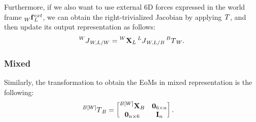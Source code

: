Furthermore, if we also want to use external 6D forces expressed in the world frame $\forcesix[W]_L^{ext}$, we can obtain the right-trivialized Jacobian by applying $\transrepr$, and then update its output representation as follows:
%
\begin{align*}
    \jac[W]_{W,L/W} = \transvel[W]_L \jac[L]_{W,L/B} \transrepr[B]_W
    .
\end{align*}

\subsubsection{Mixed}

Similarly, the transformation to obtain the \acp{EoM} in mixed representation is the following:
%
\begin{align*}
    \transrepr[{B[W]}]_B &=
    \begin{bmatrix}
        \transvel[{B[W]}]_B & \zeros_{6\times n} \\
        \zeros_{n\times6} & \eye_n
    \end{bmatrix}
    .
\end{align*}
